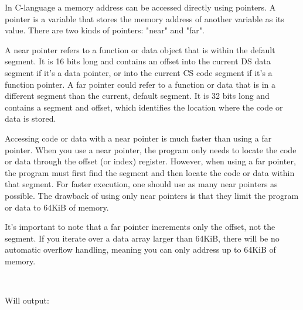 \documentclass[book.tex]{subfiles}
\begin{document}
\par
In C-language a memory address can be accessed directly using pointers. A pointer is a variable that stores the memory address of another variable as its value. There are two kinds of pointers: "near" and "far". \\

\par
A near pointer refers to a function or data object that is within the default segment. It is 16 bits long and contains an offset into the current DS data segment if it's a data pointer, or into the current CS code segment if it's a function pointer. A far pointer could refer to a function or data that is in a different segment than the current, default segment. It is 32 bits long and contains a segment and offset, which identifies the location where the code or data is stored. \\

\par
Accessing code or data with a near pointer is much faster than using a far pointer. When you use a near pointer, the program only needs to locate the code or data through the offset (or index) register. However, when using a far pointer, the program must first find the segment and then locate the code or data within that segment. For faster execution, one should use as many near pointers as possible. The drawback of using only near pointers is that they limit the program or data to 64KiB of memory.\\

\par
It's important to note that a far pointer increments only the offset, not the segment. If you iterate over a data array larger than 64KiB, there will be no automatic overflow handling, meaning you can only address up to 64KiB of memory. \\

\par
\begin{minipage}{\textwidth}
 \par
 \end{minipage}\\
\par
Will output:\\
\par
\begin{minipage}{\textwidth}
 \par
 \end{minipage}\\
\end{document}

